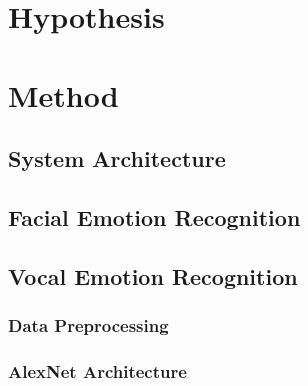 \section{Hypothesis}
\label{sec:hypothesis}

\section{Method}
\label{sec:method}

\subsection{System Architecture}
\label{subsec:method_system_architecture}

\subsection{Facial Emotion Recognition}
\label{subsec:method_facial_emotion_recognition}

\subsection{Vocal Emotion Recognition}
\label{subsec:method_vocal_emotion_recognition}

\subsubsection{Data Preprocessing}
\label{subsubsec:method_vocal_emotion_recognition_data_preprocessing}

\subsubsection{AlexNet Architecture}
\label{subsubsec:method_vocal_emotion_recognition_alexnet_architecture}